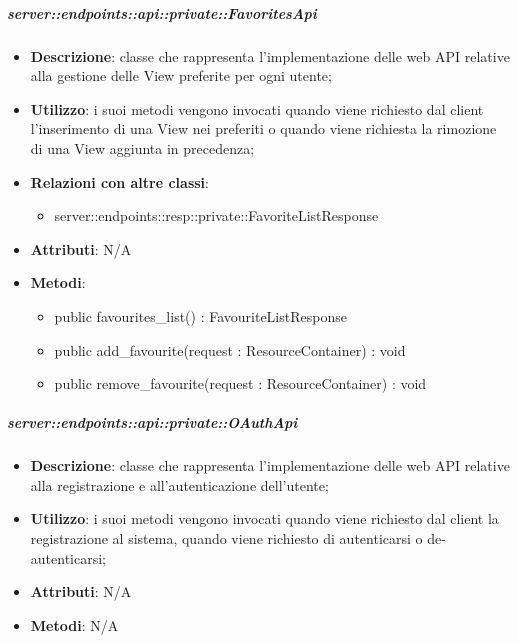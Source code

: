     \subparagraph{server::endpoints::api::private::FavoritesApi} %
    \label{subp:bdsm_app_server_endpoints_api_private_favoritesapi}
    \begin{itemize}
      \item \textbf{Descrizione}: classe che rappresenta l'implementazione delle web API relative alla gestione delle View preferite per ogni utente;
      \item \textbf{Utilizzo}: i suoi metodi vengono invocati quando viene richiesto dal client l'inserimento di una View nei preferiti o quando viene richiesta la rimozione di una View aggiunta in precedenza;
      \item \textbf{Relazioni con altre classi}:
        \begin{itemize}
          \item server::endpoints::resp::private::FavoriteListResponse
        \end{itemize}
		\item \textbf{Attributi}: N/A
		\item \textbf{Metodi}:   
			\begin{itemize}
				\item public favourites\_list() : FavouriteListResponse
				\item public add\_favourite(request : ResourceContainer) : void
				\item public remove\_favourite(request : ResourceContainer) : void
     	 \end{itemize}
      \end{itemize}
    
	\subparagraph{server::endpoints::api::private::OAuthApi} %
    \label{subp:bdsm_app_server_endpoints_api_private_oauthapi}
    \begin{itemize}
      	\item \textbf{Descrizione}: classe che rappresenta l'implementazione delle web API relative alla registrazione e all'autenticazione dell'utente;
      	\item \textbf{Utilizzo}: i suoi metodi vengono invocati quando viene richiesto dal client la registrazione al sistema, quando viene richiesto di autenticarsi o de-autenticarsi;
		\item \textbf{Attributi}: N/A
		\item \textbf{Metodi}: N/A   
    \end{itemize}

